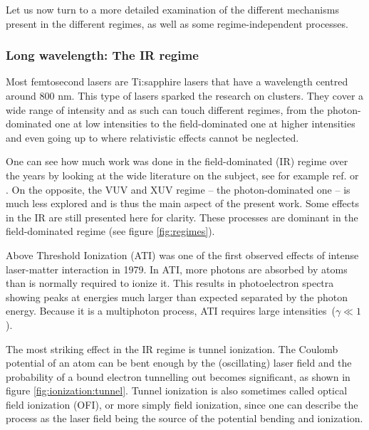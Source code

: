 Let us now turn to a more detailed examination of the different mechanisms
present in the different regimes, as well as some regime-independent processes.



\subsubsection{Long wavelength: The IR regime}
\label{section:intro:mechanisms:ir}

Most femtosecond lasers are Ti:sapphire lasers that have a wavelength centred around 800 nm.
This type of lasers sparked the research on clusters. They cover a wide range of
intensity and as such can touch different regimes, from the photon-dominated
one at low intensities to the field-dominated one at higher intensities and
even going up to where relativistic effects cannot be neglected.

One can see how much work was done in the field-dominated (IR) regime over the
years by looking at the wide literature on the subject, see for example ref.
\cite{Fennel2010} or \cite{Ramunno2008}. On the opposite, the VUV and XUV regime
-- the photon-dominated one -- is much less explored and is thus the main
aspect of the present work. Some effects in the IR are still presented here
for clarity. These processes are dominant in the field-dominated regime (see
figure \ref{fig:regimes}).



Above Threshold Ionization (ATI) was one of the first observed effects of
intense laser-matter interaction in 1979\cite{Agostini1979}.
In ATI, more photons are absorbed by atoms
than is normally required to ionize it. This results in photoelectron spectra
showing peaks at energies much larger than expected separated by the photon
energy. Because it is a multiphoton process, ATI requires large
intensities~($\gamma \ll 1$)\cite{Krainov1997,Lewenstein2008}.



The most striking effect in the IR regime is tunnel ionization\cite{Niikura2009}.
The Coulomb potential of an atom can be bent enough by the (oscillating) laser
field and the probability of a bound electron tunnelling out becomes significant,
as shown in figure \ref{fig:ionization:tunnel}. Tunnel ionization is also
sometimes called optical field ionization (OFI), or more simply field
ionization, since one can describe the process as the laser field being the source
of the potential bending and ionization.


